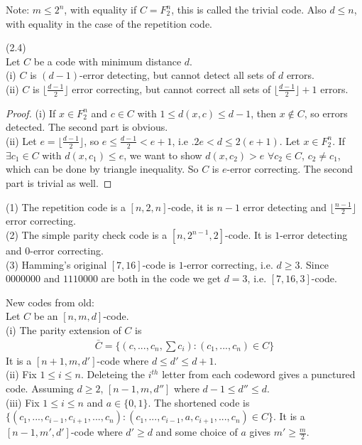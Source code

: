 \documentclass[a4paper]{article}
\begin{document}
Note: $m \leq 2^n$, with equality if $C=F_2^n$, this is called the trivial code. Also $d \leq n$, with equality in the case of the repetition code.

\begin{lemma} (2.4)\\
Let $C$ be a code with minimum distance $d$.\\
(i) $C$ is $(d-1)$-error detecting, but cannot detect all sets of $d$ errors.\\
(ii) $C$ is $\lfloor \frac{d-1}{2}\rfloor$ error correcting, but cannot correct all sets of $\lfloor \frac{d-1}{2}\rfloor+1$ errors.
\begin{proof}
(i) If $x \in F_2^n$ and $c \in C$ with $1 \leq d(x,c) \leq d-1$, then $x \not\in C$, so errors detected. The second part is obvious.\\
(ii) Let $e = \lfloor \frac{d-1}{2}\rfloor$, so $e \leq \frac{d-1}{2} < e+1$, i.e .$2e < d \leq 2(e+1)$. Let $x \in F_2^n$. If $\exists c_1 \in C$ with $d(x,c_1) \leq e$, we want to show $d(x,c_2)>e$ $\forall c_2 \in C$, $c_2 \neq c_1$, which can be done by triangle inequality. So $C$ is $e$-error correcting. The second part is trivial as well.
\end{proof}
\end{lemma}

\begin{eg}
(1) The repetition code is a $[n,2,n]$-code, it is $n-1$ error detecting and $\lfloor \frac{n-1}{2}\rfloor$ error correcting.\\
(2) The simple parity check code is a $[n,2^{n-1},2]$-code. It is $1$-error detecting and $0$-error correcting.\\
(3) Hamming's original $[7,16]$-code is $1$-error correcting, i.e. $d \geq 3$. Since $0000000$ and $1110000$ are both in the code we get $d=3$, i.e. $[7,16,3]$-code.
\end{eg}

New codes from old:\\
Let $C$ be an $[n,m,d]$-code.\\
(i) The parity extension of $C$ is 
\begin{equation*}
\begin{aligned}
\bar{C} =\{(c,...,c_n,\sum c_i): (c_1,...,c_n) \in C\}
\end{aligned}
\end{equation*}
It is a $[n+1,m,d']$-code where $d \leq d' \leq d+1$.\\
(ii) Fix $1 \leq i \leq n$. Deleteing the $i^{th}$ letter from each codeword gives a punctured code. Assuming $d \geq 2$, $[n-1,m,d'']$ where $d-1 \leq d'' \leq d$.\\
(iii) Fix $1 \leq i \leq n$ and $a \in \{0,1\}$. The shortened code is $\{(c_1,...,c_{i-1},c_{i+1},...,c_n): (c_1,...,c_{i-1},a,c_{i+1},...,c_n) \in C\}$. It is a $[n-1,m',d']$-code where $d' \geq d$ and some choice of $a$ gives $m' \geq \frac{m}{2}$.

\end{document}

